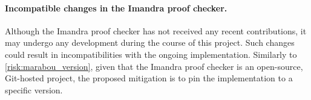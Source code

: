 \paragraph*{Incompatible changes in the Imandra proof checker.} Although the Imandra proof checker has not received any recent contributions, it may undergo any development during the course of this project. Such changes could result in incompatibilities with the ongoing implementation. Similarly to \autoref{risk:marabou_version}, given that the Imandra proof checker is an open-source, Git-hosted project, the proposed mitigation is to pin the implementation to a specific version.
